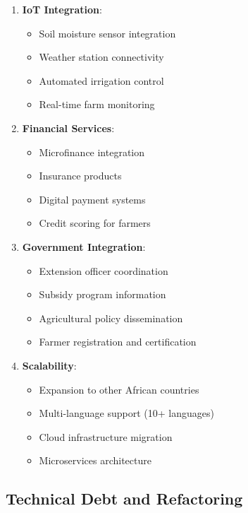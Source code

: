 \documentclass[12pt,a4paper]{article}
\begin{document}
\begin{enumerate}[leftmargin=*]
    \item \textbf{IoT Integration}:
    \begin{itemize}
        \item Soil moisture sensor integration
        \item Weather station connectivity
        \item Automated irrigation control
        \item Real-time farm monitoring
    \end{itemize}

    \item \textbf{Financial Services}:
    \begin{itemize}
        \item Microfinance integration
        \item Insurance products
        \item Digital payment systems
        \item Credit scoring for farmers
    \end{itemize}

    \item \textbf{Government Integration}:
    \begin{itemize}
        \item Extension officer coordination
        \item Subsidy program information
        \item Agricultural policy dissemination
        \item Farmer registration and certification
    \end{itemize}

    \item \textbf{Scalability}:
    \begin{itemize}
        \item Expansion to other African countries
        \item Multi-language support (10+ languages)
        \item Cloud infrastructure migration
        \item Microservices architecture
    \end{itemize}
\end{enumerate}

\subsection{Technical Debt and Refactoring}
\end{document}
